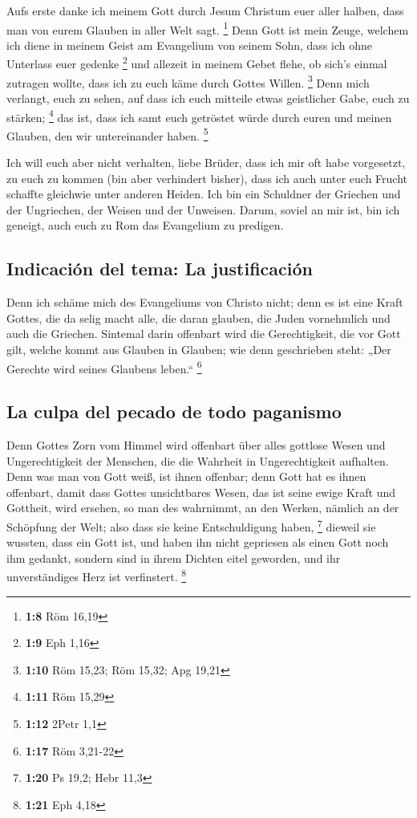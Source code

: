  Aufs erste danke ich meinem Gott durch Jesum Christum
euer aller halben, dass man von eurem Glauben in aller Welt sagt.
\footnote{\textbf{1:8} Röm 16,19}  Denn Gott ist mein
Zeuge, welchem ich diene in meinem Geist am Evangelium von seinem Sohn,
dass ich ohne Unterlass euer gedenke \footnote{\textbf{1:9} Eph 1,16}
 und allezeit in meinem Gebet flehe, ob sich's einmal
zutragen wollte, dass ich zu euch käme durch Gottes Willen. \footnote{\textbf{1:10}
  Röm 15,23; Röm 15,32; Apg 19,21}  Denn mich verlangt,
euch zu sehen, auf dass ich euch mitteile etwas geistlicher Gabe, euch
zu stärken; \footnote{\textbf{1:11} Röm 15,29}  das ist,
dass ich samt euch getröstet würde durch euren und meinen Glauben, den
wir untereinander haben. \footnote{\textbf{1:12} 2Petr 1,1}

 Ich will euch aber nicht verhalten, liebe Brüder, dass
ich mir oft habe vorgesetzt, zu euch zu kommen (bin aber verhindert
bisher), dass ich auch unter euch Frucht schaffte gleichwie unter
anderen Heiden.  Ich bin ein Schuldner der Griechen und
der Ungriechen, der Weisen und der Unweisen.  Darum,
soviel an mir ist, bin ich geneigt, auch euch zu Rom das Evangelium zu
predigen.

\hypertarget{indicaciuxf3n-del-tema-la-justificaciuxf3n}{%
\subsection{Indicación del tema: La
justificación}\label{indicaciuxf3n-del-tema-la-justificaciuxf3n}}

 Denn ich schäme mich des Evangeliums von Christo nicht;
denn es ist eine Kraft Gottes, die da selig macht alle, die daran
glauben, die Juden vornehmlich und auch die Griechen. 
Sintemal darin offenbart wird die Gerechtigkeit, die vor Gott gilt,
welche kommt aus Glauben in Glauben; wie denn geschrieben steht: „Der
Gerechte wird seines Glaubens leben.`` \footnote{\textbf{1:17} Röm
  3,21-22}

\hypertarget{la-culpa-del-pecado-de-todo-paganismo}{%
\subsection{La culpa del pecado de todo
paganismo}\label{la-culpa-del-pecado-de-todo-paganismo}}

 Denn Gottes Zorn vom Himmel wird offenbart über alles
gottlose Wesen und Ungerechtigkeit der Menschen, die die Wahrheit in
Ungerechtigkeit aufhalten.  Denn was man von Gott weiß,
ist ihnen offenbar; denn Gott hat es ihnen offenbart, 
damit dass Gottes unsichtbares Wesen, das ist seine ewige Kraft und
Gottheit, wird ersehen, so man des wahrnimmt, an den Werken, nämlich an
der Schöpfung der Welt; also dass sie keine Entschuldigung haben,
\footnote{\textbf{1:20} Ps 19,2; Hebr 11,3}  dieweil sie
wussten, dass ein Gott ist, und haben ihn nicht gepriesen als einen Gott
noch ihm gedankt, sondern sind in ihrem Dichten eitel geworden, und ihr
unverständiges Herz ist verfinstert. \footnote{\textbf{1:21} Eph 4,18}

